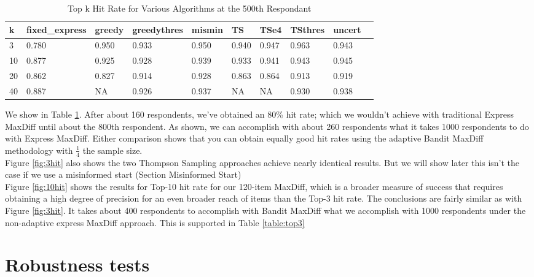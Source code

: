 \documentclass[nonblindrev]{informs3}
\begin{document}
\begin{table}
\begin{center}
\begin{tabular}{llllllllll}
\hline   k &  fixed\_express &  greedy &  greedythres &  mismin &    TS &  TSe4 &  TSthres &  uncert \\\hline   3 &          0.780 &   0.950 &        0.933 &   0.950 & 0.940 & 0.947 &    0.963 &   0.943 \\  10 &          0.877 &   0.925 &        0.928 &   0.939 & 0.933 & 0.941 &    0.943 &   0.945 \\  20 &          0.862 &   0.827 &        0.914 &   0.928 & 0.863 & 0.864 &    0.913 &   0.919 \\  40 &          0.887 &   NA &        0.926 &   0.937 & NA & NA &    0.930 &   0.938 \end{tabular}
\end{center}
\caption{Top k Hit Rate for Various Algorithms at the 500th Respondant}
\label{table:at500}
\end{table}
 We show in Table \ref{table:at500}. After about 160 respondents, we've obtained an 80\% hit rate; which we wouldn't achieve with traditional Express MaxDiff until about the 800th respondent.  As shown, we can accomplish with about 260 respondents what it takes 1000 respondents to do with Express MaxDiff.  Either comparison shows that you can obtain equally good hit rates using the adaptive Bandit MaxDiff methodology with $\frac{1}{4}$ the sample size.\\
Figure \ref{fig:3hit} also shows the two Thompson Sampling approaches achieve nearly identical results. But we will show later this isn't the case if we use a misinformed start (Section Misinformed Start)\\
Figure \ref{fig:10hit} shows the results for Top-10 hit rate for our 120-item MaxDiff, which is a broader measure of success that requires obtaining a high degree of precision for an even broader reach of items than the Top-3 hit rate.  The conclusions are fairly similar as with Figure \ref{fig:3hit}.  It takes about 400 respondents to accomplish with Bandit MaxDiff what we accomplish with 1000 respondents under the non-adaptive express MaxDiff approach. This is supported in Table \ref{table:top3}\\


\section{Robustness tests}
\end{document}
